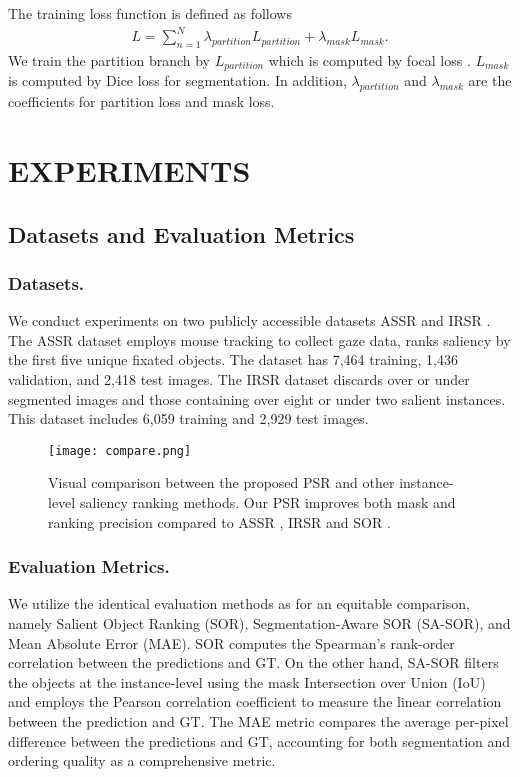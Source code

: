 \documentclass[sigconf]{acmart}
\begin{document}
The training loss function is defined as follows
 \begin{equation}
 \begin{split}
L =  \sum_{n=1}^{N} \lambda_{partition} L_{partition}  + \lambda_{mask}L_{mask}.
 \end{split}
 \end{equation}
We train the partition branch by $L_{partition}$ which is computed by focal loss \cite{lin2017focal}. $L_{mask}$ is computed by Dice loss for segmentation. In addition, $\lambda_{partition}$ and  $\lambda_{mask}$ are the coefficients for partition loss and mask loss.


\section{EXPERIMENTS}

\subsection{Datasets and Evaluation Metrics}
\subsubsection{Datasets.} 
We conduct experiments on two publicly accessible datasets ASSR \cite{siris2020inferring} and IRSR \cite{liu2021instance}. The ASSR dataset employs mouse tracking to collect gaze data, ranks saliency by the first five unique fixated objects. The dataset has 7,464 training, 1,436 validation, and 2,418 test images. The IRSR dataset discards over or under segmented images and those containing over eight or under two salient instances. This dataset includes 6,059 training and 2,929 test images.

 \begin{figure*}
	\begin{center}
		\texttt{[image: compare.png]}
		\caption{Visual comparison between the proposed PSR and other instance-level saliency ranking methods. Our PSR improves both mask and ranking precision compared to ASSR \cite{siris2020inferring}, IRSR \cite{liu2021instance} and SOR \cite{fang2021salient}.
		}\label{fig:compare}
	\end{center}
\end{figure*}

\subsubsection{Evaluation Metrics.} 
We utilize the identical evaluation methods as \cite{siris2020inferring, liu2021instance} for an equitable comparison, namely Salient Object Ranking (SOR), Segmentation-Aware SOR (SA-SOR), and Mean Absolute Error (MAE). SOR computes the Spearman's rank-order correlation between the predictions and GT. On the other hand, SA-SOR filters the objects at the instance-level using the mask Intersection over Union (IoU) and employs the Pearson correlation coefficient to measure the linear correlation between the prediction and GT. The MAE metric compares the average per-pixel difference between the predictions and GT, accounting for both segmentation and ordering quality as a comprehensive metric. 
\end{document}
